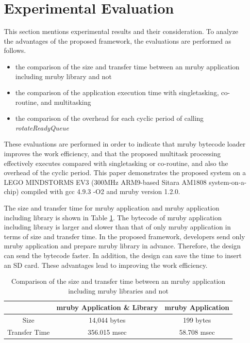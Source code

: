 \documentclass[conference,compsoc]{IEEEtran}
\begin{document}
\section{Experimental Evaluation}
\label{sec:Evaluation}
This section mentions experimental results and their consideration.
To analyze the advantages of the proposed framework, the evaluations are performed as follows.
\begin{itemize}
    \item the comparison of the size and transfer time between an mruby application including mruby library and not
    \item the comparison of the application execution time with singletasking, co-routine, and multitasking
    \item the comparison of the overhead for each cyclic period of calling {\it rotateReadyQueue}
\end{itemize}

These evaluations are performed in order to indicate that mruby bytecode loader improves the work efficiency, and that the proposed multitask processing effectively executes compared with singletasking or co-routine, and also the overhead of the cyclic period.
This paper demonstrates the proposed system on a LEGO MINDSTORMS EV3 (300MHz ARM9-based Sitara AM1808 system-on-a-chip) compiled with gcc 4.9.3 -O2 and mruby version 1.2.0.

The size and transfer time for mruby application and mruby application including library is shown in Table \ref{tab:size_and_time}.
The bytecode of mruby application including library is larger and slower than that of only mruby application in terms of size and transfer time.
In the proposed framework, developers send only mruby application and prepare mruby library in advance.
Therefore, the design can send the bytecode faster.
In addition, the design can save the time to insert an SD card.
These advantages lead to improving the work efficiency.

\begin{table}[t]
    \centering
    \caption{Comparison of the size and transfer time between an mruby application including mruby libraries and not}
    \begin{tabular}{c||c|c}
                        & mruby Application \& Library & mruby Application  \\ \hline
          Size          & 14,044 bytes                 & 199 bytes          \\ %
          Transfer Time & 356.015 msec                 & 58.708 msec        \\
    \end{tabular}
    \label{tab:size_and_time}
\end{table}
\end{document}
